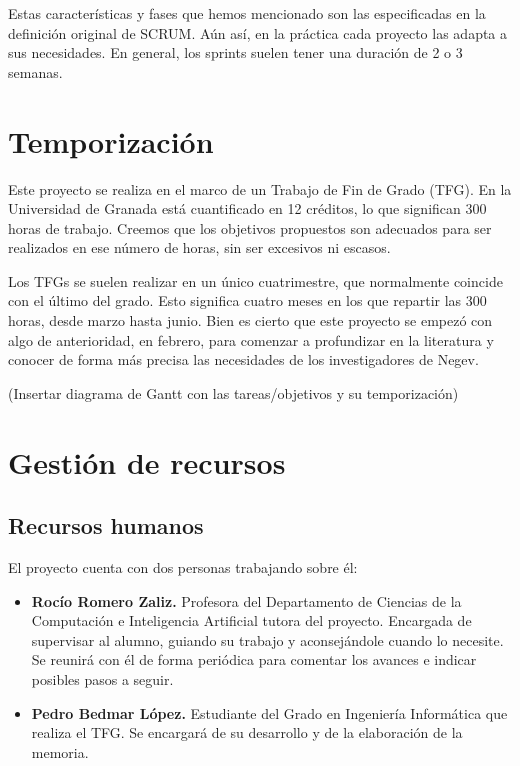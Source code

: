 Estas características y fases que hemos mencionado son las especificadas en la definición original de SCRUM. Aún así, en la práctica cada proyecto las adapta a sus necesidades. En general, los sprints suelen tener una duración de 2 o 3 semanas. 

\section{Temporización}

Este proyecto se realiza en el marco de un Trabajo de Fin de Grado (TFG). En la Universidad de Granada está cuantificado en 12 créditos, lo que significan 300 horas de trabajo. Creemos que los objetivos propuestos son adecuados para ser realizados en ese número de horas, sin ser excesivos ni escasos.

Los TFGs se suelen realizar en un único cuatrimestre, que normalmente coincide con el último del grado. Esto significa cuatro meses en los que repartir las 300 horas, desde marzo hasta junio. Bien es cierto que este proyecto se empezó con algo de anterioridad, en febrero, para comenzar a profundizar en la literatura y conocer de forma más precisa las necesidades de los investigadores de Negev.

(Insertar diagrama de Gantt con las tareas/objetivos y su temporización)

\section{Gestión de recursos}

\subsection{Recursos humanos}
\noindent El proyecto cuenta con dos personas trabajando sobre él:
\begin{itemize}
    \item \textbf{Rocío Romero Zaliz.} Profesora del Departamento de Ciencias de la Computación e Inteligencia Artificial tutora del proyecto. Encargada de supervisar al alumno, guiando su trabajo y aconsejándole cuando lo necesite. Se reunirá con él de forma periódica para comentar los avances e indicar posibles pasos a seguir.
    \item \textbf{Pedro Bedmar López.} Estudiante del Grado en Ingeniería Informática que realiza el TFG. Se encargará de su desarrollo y de la elaboración de la memoria.
\end{itemize}

